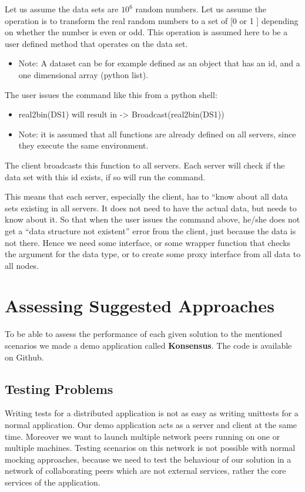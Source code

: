 Let us assume the data sets are \(10^6\) random numbers.
Let us assume the operation is to transform the real random numbers to a set of [0 or 1 ] depending on whether the number is even or odd. 
This operation is assumed here to be a user defined method that operates on the data set.

\begin{itemize}
\item Note: A dataset can be for example defined as an object that has an id, and a one dimensional array (python list).
\end{itemize}

The user issues the command like this from a python shell: 

\begin{itemize}
\item real2bin(DS1) will result in -> Broadcast(real2bin(DS1))
\item Note: it is assumed that all functions are already defined on all servers, since they execute the same environment.
\end{itemize}

The client broadcasts this function to all servers. Each server will check if the data set with this id exists, if so will run the command. 

This means that each server, especially the client, has to “know about all data sets existing in all servers.
It does not need to have the actual data, but needs to know about it. So that when the user issues the command
above, he/she does not get a “data structure not existent” error from the client, just because the data is not
there. Hence we need some interface, or some wrapper function that checks the argument for the data type, or to 
create some proxy interface from all data to all nodes. 

\section{Assessing Suggested Approaches}
To be able to assess the performance of each given solution to the mentioned scenarios we made a demo application
called \textbf{Konsensus}. The code is available on Github. %

\subsection{Testing Problems}
Writing tests for a distributed application is not as easy as writing unittests for a normal application. 
Our demo application acts as a server and client at the same time. Moreover we want to launch multiple 
network peers running on one or multiple machines. Testing scenarios on this network is not possible with
normal mocking approaches, because we need to test the behaviour of our solution in a network of collaborating
peers which are not external services, rather the core services of the application.

